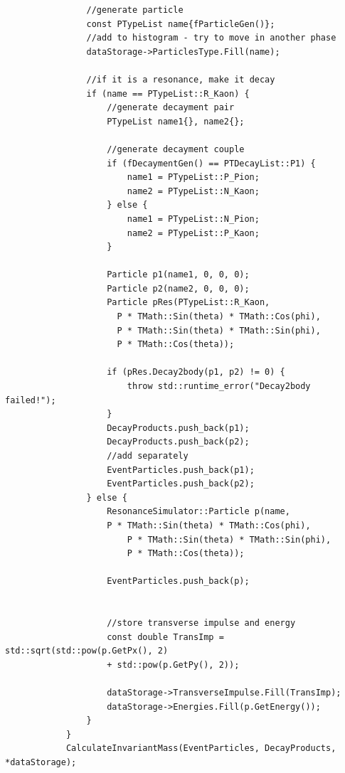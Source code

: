 \documentclass[12pt, a4paper]{article}
\begin{document}
\begin{verbatim}
                //generate particle
                const PTypeList name{fParticleGen()};
                //add to histogram - try to move in another phase
                dataStorage->ParticlesType.Fill(name);

                //if it is a resonance, make it decay
                if (name == PTypeList::R_Kaon) {
                    //generate decayment pair
                    PTypeList name1{}, name2{};

                    //generate decayment couple
                    if (fDecaymentGen() == PTDecayList::P1) {
                        name1 = PTypeList::P_Pion;
                        name2 = PTypeList::N_Kaon;
                    } else {
                        name1 = PTypeList::N_Pion;
                        name2 = PTypeList::P_Kaon;
                    }

                    Particle p1(name1, 0, 0, 0);
                    Particle p2(name2, 0, 0, 0);
                    Particle pRes(PTypeList::R_Kaon, 
                      P * TMath::Sin(theta) * TMath::Cos(phi),
                      P * TMath::Sin(theta) * TMath::Sin(phi), 
                      P * TMath::Cos(theta));

                    if (pRes.Decay2body(p1, p2) != 0) {
                        throw std::runtime_error("Decay2body failed!");
                    }
                    DecayProducts.push_back(p1);
                    DecayProducts.push_back(p2);
                    //add separately
                    EventParticles.push_back(p1);
                    EventParticles.push_back(p2);
                } else {
                    ResonanceSimulator::Particle p(name, 
                    P * TMath::Sin(theta) * TMath::Cos(phi),
                        P * TMath::Sin(theta) * TMath::Sin(phi), 
                        P * TMath::Cos(theta));
                        
                    EventParticles.push_back(p);
                    
                    
                    //store transverse impulse and energy
                    const double TransImp = std::sqrt(std::pow(p.GetPx(), 2) 
                    + std::pow(p.GetPy(), 2));
                    
                    dataStorage->TransverseImpulse.Fill(TransImp);
                    dataStorage->Energies.Fill(p.GetEnergy());
                }
            }
            CalculateInvariantMass(EventParticles, DecayProducts, *dataStorage);


\end{verbatim}
\end{document}
